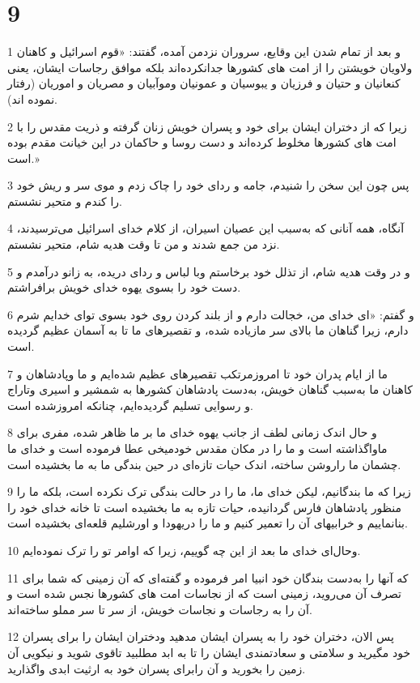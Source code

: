 \chapter{9}

\par 1 و بعد از تمام شدن این وقایع، سروران نزدمن آمده، گفتند: «قوم اسرائیل و کاهنان ولاویان خویشتن را از امت های کشورها جدانکرده‌اند بلکه موافق رجاسات ایشان، یعنی کنعانیان و حتیان و فرزیان و یبوسیان و عمونیان وموآبیان و مصریان و اموریان (رفتار نموده اند).
\par 2 زیرا که از دختران ایشان برای خود و پسران خویش زنان گرفته و ذریت مقدس را با امت های کشورها مخلوط کرده‌اند و دست روسا و حاکمان در این خیانت مقدم بوده است.»
\par 3 پس چون این سخن را شنیدم، جامه و ردای خود را چاک زدم و موی سر و ریش خود را کندم و متحیر نشستم.
\par 4 آنگاه، همه آنانی که به‌سبب این عصیان اسیران، از کلام خدای اسرائیل می‌ترسیدند، نزد من جمع شدند و من تا وقت هدیه شام، متحیر نشستم.
\par 5 و در وقت هدیه شام، از تذلل خود برخاستم وبا لباس و ردای دریده، به زانو درآمدم و دست خود را بسوی یهوه خدای خویش برافراشتم.
\par 6 و گفتم: «ای خدای من، خجالت دارم و از بلند کردن روی خود بسوی توای خدایم شرم دارم، زیرا گناهان ما بالای سر مازیاده شده، و تقصیرهای ما تا به آسمان عظیم گردیده است.
\par 7 ما از ایام پدران خود تا امروزمرتکب تقصیرهای عظیم شده‌ایم و ما وپادشاهان و کاهنان ما به‌سبب گناهان خویش، به‌دست پادشاهان کشورها به شمشیر و اسیری وتاراج و رسوایی تسلیم گردیده‌ایم، چنانکه امروزشده است.
\par 8 و حال اندک زمانی لطف از جانب یهوه خدای ما بر ما ظاهر شده، مفری برای ماواگذاشته است و ما را در مکان مقدس خودمیخی عطا فرموده است و خدای ما چشمان ما راروشن ساخته، اندک حیات تازه‌ای در حین بندگی ما به ما بخشیده است.
\par 9 زیرا که ما بندگانیم، لیکن خدای ما، ما را در حالت بندگی ترک نکرده است، بلکه ما را منظور پادشاهان فارس گردانیده، حیات تازه به ما بخشیده است تا خانه خدای خود را بنانماییم و خرابیهای آن را تعمیر کنیم و ما را دریهودا و اورشلیم قلعه‌ای بخشیده است.
\par 10 وحال‌ای خدای ما بعد از این چه گوییم، زیرا که اوامر تو را ترک نموده‌ایم.
\par 11 که آنها را به‌دست بندگان خود انبیا امر فرموده و گفته‌ای که آن زمینی که شما برای تصرف آن می‌روید، زمینی است که از نجاسات امت های کشورها نجس شده است و آن را به رجاسات و نجاسات خویش، از سر تا سر مملو ساخته‌اند.
\par 12 پس الان، دختران خود را به پسران ایشان مدهید ودختران ایشان را برای پسران خود مگیرید و سلامتی و سعادتمندی ایشان را تا به ابد مطلبید تاقوی شوید و نیکویی آن زمین را بخورید و آن رابرای پسران خود به ارثیت ابدی واگذارید.
